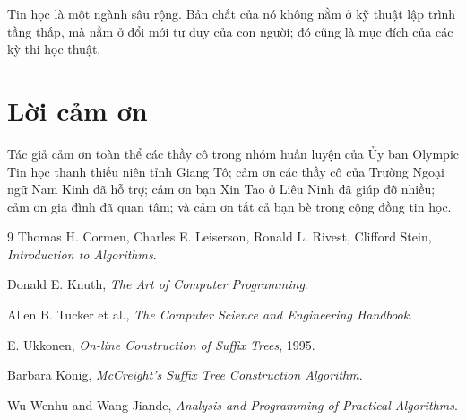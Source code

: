 \documentclass[11pt]{article}
\begin{document}
Tin học là một ngành sâu rộng. Bản chất của nó không nằm ở kỹ thuật lập trình
tầng thấp, mà nằm ở đổi mới tư duy của con người; đó cũng là mục đích của các
kỳ thi học thuật.

\section*{Lời cảm ơn}

Tác giả cảm ơn toàn thể các thầy cô trong nhóm huấn luyện của Ủy ban Olympic
Tin học thanh thiếu niên tỉnh Giang Tô; cảm ơn các thầy cô của Trường Ngoại
ngữ Nam Kinh đã hỗ trợ; cảm ơn bạn Xin Tao ở Liêu Ninh đã giúp đỡ nhiều; cảm
ơn gia đình đã quan tâm; và cảm ơn tất cả bạn bè trong cộng đồng tin học.

\begin{thebibliography}{9}
Thomas H. Cormen, Charles E. Leiserson, Ronald L. Rivest, Clifford Stein,
\emph{Introduction to Algorithms}.

Donald E. Knuth,
\emph{The Art of Computer Programming}.

Allen B. Tucker et al.,
\emph{The Computer Science and Engineering Handbook}.

E. Ukkonen,
\emph{On-line Construction of Suffix Trees}, 1995.

Barbara König,
\emph{McCreight's Suffix Tree Construction Algorithm}.

Wu Wenhu and Wang Jiande,
\emph{Analysis and Programming of Practical Algorithms}.
\end{thebibliography}
\end{document}
